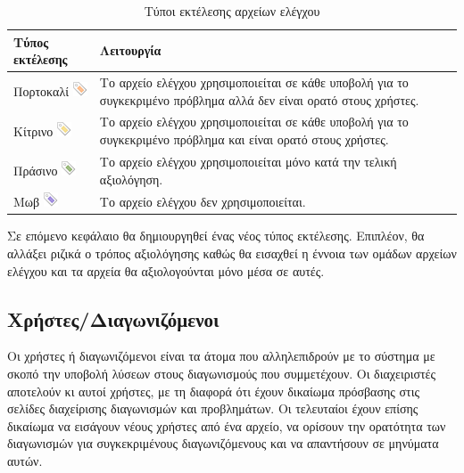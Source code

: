 \documentclass[diploma]{softlab-thesis}
\begin{document}
  \begin{table}
    \begin{tabular}{ | l | p{10cm} |}
    \hline
    Τύπος εκτέλεσης & Λειτουργία \\ \hline
    Πορτοκαλί \includegraphics[scale=0.8]{Figures/tag_orange.png} &
      Το αρχείο ελέγχου χρησιμοποιείται σε κάθε υποβολή για το συγκεκριμένο πρόβλημα
      αλλά δεν είναι ορατό στους χρήστες. \\ \hline
    Κίτρινο \includegraphics[scale=0.8]{Figures/tag_yellow.png} &
      Το αρχείο ελέγχου χρησιμοποιείται σε κάθε υποβολή για το συγκεκριμένο πρόβλημα
      και είναι ορατό στους χρήστες. \\ \hline
    Πράσινο \includegraphics[scale=0.8]{Figures/tag_green.png} &
      Το αρχείο ελέγχου χρησιμοποιείται μόνο κατά την τελική αξιολόγηση. \\ \hline
    Μωβ \includegraphics[scale=0.8]{Figures/tag_purple.png} &
      Το αρχείο ελέγχου δεν χρησιμοποιείται. \\ \hline
    \end{tabular}
  \caption{Τύποι εκτέλεσης αρχείων ελέγχου}
  \end{table}

\bigskip

Σε επόμενο κεφάλαιο θα δημιουργηθεί ένας νέος τύπος εκτέλεσης. Επιπλέον, θα
αλλάξει ριζικά ο τρόπος αξιολόγησης καθώς θα εισαχθεί η έννοια των ομάδων
αρχείων ελέγχου και τα αρχεία θα αξιολογούνται μόνο μέσα σε αυτές.

\subsection{Χρήστες/Διαγωνιζόμενοι}

Οι χρήστες ή διαγωνιζόμενοι είναι τα άτομα που αλληλεπιδρούν με το σύστημα με
σκοπό την υποβολή λύσεων στους διαγωνισμούς που συμμετέχουν. Οι διαχειριστές
αποτελούν κι αυτοί χρήστες, με τη διαφορά ότι έχουν δικαίωμα πρόσβασης στις
σελίδες διαχείρισης διαγωνισμών και προβλημάτων. Οι τελευταίοι έχουν επίσης
δικαίωμα να εισάγουν νέους χρήστες από ένα αρχείο, να ορίσουν την ορατότητα των
διαγωνισμών για συγκεκριμένους διαγωνιζόμενους και να απαντήσουν σε μηνύματα
αυτών.
\end{document}

